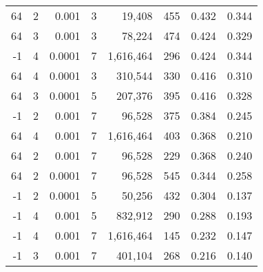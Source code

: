 \begin{table}[h]
\begin{tabular}{rrrrrrrr}
64 & 2 & 0.001 & 3 & 19,408 & 455 & 0.432 & 0.344 \\
64 & 3 & 0.001 & 3 & 78,224 & 474 & 0.424 & 0.329 \\
-1 & 4 & 0.0001 & 7 & 1,616,464 & 296 & 0.424 & 0.344 \\
64 & 4 & 0.0001 & 3 & 310,544 & 330 & 0.416 & 0.310 \\
64 & 3 & 0.0001 & 5 & 207,376 & 395 & 0.416 & 0.328 \\
-1 & 2 & 0.001 & 7 & 96,528 & 375 & 0.384 & 0.245 \\
64 & 4 & 0.001 & 7 & 1,616,464 & 403 & 0.368 & 0.210 \\
64 & 2 & 0.001 & 7 & 96,528 & 229 & 0.368 & 0.240 \\
64 & 2 & 0.0001 & 7 & 96,528 & 545 & 0.344 & 0.258 \\
-1 & 2 & 0.0001 & 5 & 50,256 & 432 & 0.304 & 0.137 \\
-1 & 4 & 0.001 & 5 & 832,912 & 290 & 0.288 & 0.193 \\
-1 & 4 & 0.001 & 7 & 1,616,464 & 145 & 0.232 & 0.147 \\
-1 & 3 & 0.001 & 7 & 401,104 & 268 & 0.216 & 0.140 \\
\bottomrule
\end{tabular}

\normalsize
\end{table}
